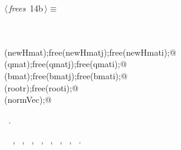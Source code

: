 \documentclass{article}
\begin{document}
\begin{flushleft}
\begin{minipage}{\linewidth}
\begin{list}{}{\setlength{\itemsep}{-\parsep}\setlength{\itemindent}{-\leftmargin}}
\item{}
\end{list}
\end{minipage}\vspace{4ex}
\end{flushleft}
\begin{flushleft} \small
\begin{minipage}{\linewidth}\label{scrap18}\raggedright\small
{} $\langle\,${\itshape frees}\nobreak\ {\footnotesize {14b}}$\,\rangle\equiv$
\vspace{-1ex}
\begin{list}{}{} \item
\mbox{}\verb@@\\
\mbox{}\verb@@\\
\mbox{}\verb@free(newHmat);free(newHmatj);free(newHmati);@\\
\mbox{}\verb@free(qmat);free(qmatj);free(qmati);@\\
\mbox{}\verb@free(bmat);free(bmatj);free(bmati);@\\
\mbox{}\verb@free(rootr);free(rooti);@\\
\mbox{}\verb@free(normVec);@\\
\mbox{}\verb@@{\NWsep}
\end{list}
\vspace{-1.5ex}
\footnotesize
\begin{list}{}{\setlength{\itemsep}{-\parsep}\setlength{\itemindent}{-\leftmargin}}
\item \NWtxtMacroRefIn\ .
\item \NWtxtIdentsUsed\nobreak\  \verb@newHmat@\nobreak\ , \verb@newHmati@\nobreak\ , \verb@newHmatj@\nobreak\ , \verb@qmat@\nobreak\ , \verb@qmati@\nobreak\ , \verb@qmatj@\nobreak\ , \verb@rooti@\nobreak\ , \verb@rootr@\nobreak\ .
\item{}
\end{list}
\end{minipage}\vspace{4ex}
\end{flushleft}
\end{document}
